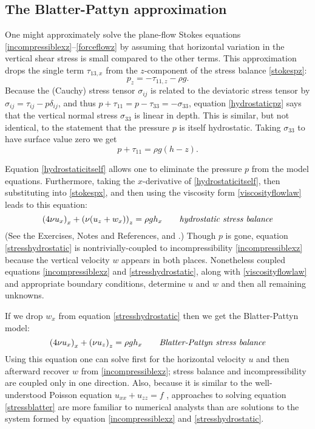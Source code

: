 \documentclass[letterpaper,final,12pt,reqno]{amsart}
\begin{document}
\subsection*{The Blatter-Pattyn approximation}  One might approximately solve the plane-flow Stokes equations \eqref{incompressiblexz}--\eqref{forceflowz} by assuming that horizontal variation in the vertical shear stress is small compared to the other terms.  This approximation drops the single term  $\tau_{13,x}$ from the $z$-component of the stress balance \eqref{stokespz}:
\begin{equation}
p_z = - \tau_{11,z} - \rho g. \label{hydrostaticpz}
\end{equation}
Because the (Cauchy) stress tensor $\sigma_{ij}$ is related to the deviatoric stress tensor by $\sigma_{ij} = \tau_{ij} - p \delta_{ij}$, and thus $p + \tau_{11} = p - \tau_{33} = - \sigma_{33}$, equation \eqref{hydrostaticpz} says that the vertical normal stress $\sigma_{33}$ is linear in depth.  This is similar, but not identical, to the statement that the pressure $p$ is itself hydrostatic.  Taking $\sigma_{33}$ to have surface value zero we get
\begin{equation}
p + \tau_{11} = \rho g (h-z). \label{hydrostaticitself}
\end{equation}

Equation \eqref{hydrostaticitself} allows one to eliminate the pressure $p$ from the model equations.  Furthermore, taking the $x$-derivative of \eqref{hydrostaticitself}, then substituting into \eqref{stokespx}, and then using the viscosity form \eqref{viscosityflowlaw} leads to this equation:
\begin{equation}
\left(4 \nu u_x\right)_x + \left(\nu (u_z+w_x)\right)_z = \rho g h_x \qquad\text{\emph{hydrostatic stress balance}} \label{stresshydrostatic}
\end{equation}
(See the Exercises, Notes and References, and \cite{GreveBlatter2009}.)  Though $p$ is gone, equation \eqref{stresshydrostatic} is nontrivially-coupled to incompressibility \eqref{incompressiblexz} because the vertical velocity $w$ appears in both places.  Nonetheless coupled equations \eqref{incompressiblexz} and \eqref{stresshydrostatic}, along with \eqref{viscosityflowlaw} and appropriate boundary conditions, determine $u$ and $w$ and then all remaining unknowns.

If we drop $w_x$ from equation \eqref{stresshydrostatic} then we get the Blatter-Pattyn model:
\begin{equation}
\left(4 \nu u_x\right)_x + \left(\nu u_z\right)_z = \rho g h_x \qquad\text{\emph{Blatter-Pattyn stress balance}} \label{stressblatter}
\end{equation}
Using this equation one can solve first for the horizontal velocity $u$ and then afterward recover $w$ from \eqref{incompressiblexz}; stress balance and incompressibility are coupled only in one direction.  Also, because it is similar to the well-understood Poisson equation $u_{xx} + u_{zz} = f$ \cite{MortonMayers}, approaches to solving equation \eqref{stressblatter} are more familiar to numerical analysts than are solutions to the system formed by equation \eqref{incompressiblexz} and \eqref{stresshydrostatic}.
\end{document}
